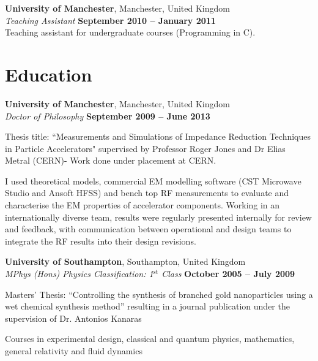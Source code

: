 \documentclass[margin,line]{resume}
\begin{document}
\begin{resume}
    \textbf{University of Manchester}, Manchester, United Kingdom \vspace{2mm}\\\vspace{1mm}%
    \textsl{Teaching Assistant} \hfill \textbf{September 2010 -- January 2011}\\
    Teaching assistant for undergraduate courses (Programming in C).


    \section{\mysidestyle Education}

    \textbf{University of Manchester}, Manchester, United Kingdom \vspace{2mm}\\\vspace{1mm}%
    \textsl{Doctor of Philosophy} \hfill \textbf{ September 2009 -- June 2013}\vspace{-3mm}\\\vspace{-1mm}%
    \begin{list2}
        \item Thesis title: ``Measurements and Simulations of Impedance Reduction Techniques in Particle Accelerators" supervised by Professor Roger Jones and Dr Elias Metral (CERN)- Work done under placement at CERN.
        \item I used theoretical models, commercial EM modelling software (CST Microwave Studio and Ansoft HFSS) and bench top RF measurements to evaluate and characterise the EM properties of accelerator components. Working in an internationally diverse team, results were regularly presented internally for review and feedback, with communication between operational and design teams to integrate the RF results into their design revisions.
    \end{list2}\vspace{-1.5mm}
    \textbf{University of Southampton}, Southampton, United Kingdom \vspace{2mm}\\\vspace{1mm}%
    \textsl{MPhys (Hons) Physics Classification: 1$^{\mathrm{st}}$ Class} \hfill \textbf{October 2005 -- July 2009}\vspace{-3mm}\\\vspace{-1mm}%
    \begin{list2}
        \item Masters' Thesis: ``Controlling the synthesis of branched gold nanoparticles using a wet chemical synthesis method'' resulting in a journal publication under the supervision of Dr. Antonios Kanaras
        \item Courses in experimental design, classical and quantum physics, mathematics, general relativity and fluid dynamics
    \end{list2}\vspace{-1.5mm}


\end{resume}
\end{document}

